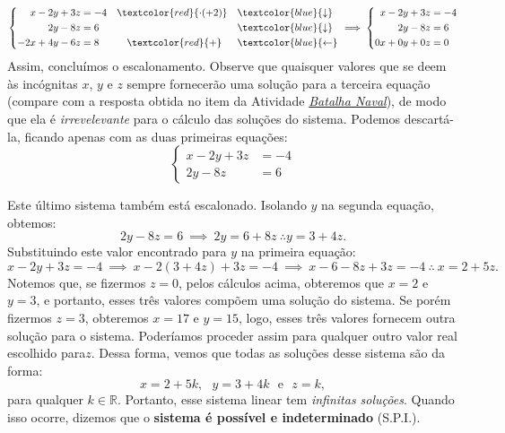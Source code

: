\begin{example}{}
\begin{equation*}
\left \{
\begin{aligned}
x-2y+3z&=-4 &&\textcolor{red}{\cdot(+2)} &&\vspace{1ex}\textcolor{blue}{\downarrow}\\
2y-8z&=6 &&&&\vspace{1ex}\textcolor{blue}{\downarrow}\\
-2x+4y-6z&=8 &&\quad\textcolor{red}{+}  &&\textcolor{blue}{\leftarrow}
\end{aligned}
\right.
\implies
\left \{
\begin{aligned}
x-2y+3z&=-4\\
2y-8z&=6\\
0x+0y+0z&=0
\end{aligned}
\right.
\end{equation*}
Assim, concluímos o escalonamento. Observe que quaisquer valores que se deem às incógnitas $x$, $y$ e $z$ sempre fornecerão uma solução para a terceira equação (compare com a resposta obtida no item  da Atividade \hyperref[batalha-naval]{\textit{Batalha Naval}}), de modo que ela é \emph{irrevelevante} para o cálculo das soluções do sistema. Podemos descartá-la, ficando apenas com as duas primeiras equações:
\begin{equation*}
\left \{
\begin{aligned}
x-2y+3z&=-4\\
2y-8z&=6
\end{aligned}
\right.
\end{equation*}

Este último sistema também está escalonado. Isolando $y$ na segunda equação, obtemos:
$$
2y - 8z = 6 \ \implies \ 2y = 6 + 8z \ \therefore y = 3 + 4z.
$$
Substituindo este valor encontrado para $y$ na primeira equação:
$$
x - 2y +3z = -4 \ \implies \ x -2(3+4z) + 3z = -4 \ \implies \ x -6 - 8z +3z = -4 \ \therefore \ x = 2 +5z.
$$
Notemos que, se fizermos $z = 0$, pelos cálculos acima, obteremos que $x = 2$ e $y = 3$, e portanto, esses três valores compõem uma solução do sistema. Se porém fizermos $z = 3$, obteremos $x = 17$ e $y = 15$, logo, esses três valores fornecem outra solução para o sistema. Poderíamos proceder assim para qualquer outro valor real escolhido para$z$. Dessa forma, vemos que todas as soluções desse sistema são da forma:
$$
x = 2 + 5k, \ \ \ y = 3 + 4k \ \ \ \mbox{e} \ \ \ z = k, 
$$   
para qualquer $k \in \mathbb{R}$. Portanto, esse sistema linear tem \emph{infinitas soluções}. Quando isso ocorre, dizemos que o \textbf{sistema é possível e indeterminado} (S.P.I.).
\end{example}

